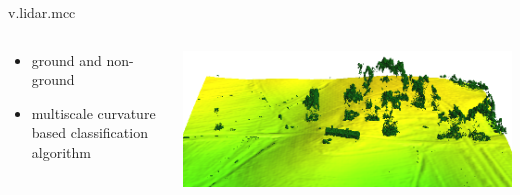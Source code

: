\documentclass[xcolor={dvipsnames,usenames},beamer,aspectratio=169]{beamer}
\begin{document}
\begin{frame}{v.lidar.mcc}

\begin{columns}
\begin{column}{0.28\textwidth}

\begin{itemize}
  \item ground and non-ground
  \item multiscale curvature based classification algorithm
\end{itemize}

\end{column}
\begin{column}{0.7\textwidth}

\begin{center}
  \includegraphics[width=\textwidth]{grass/mcc_default}
\end{center}

\end{column}
\end{columns}

\end{frame}
\end{document}
